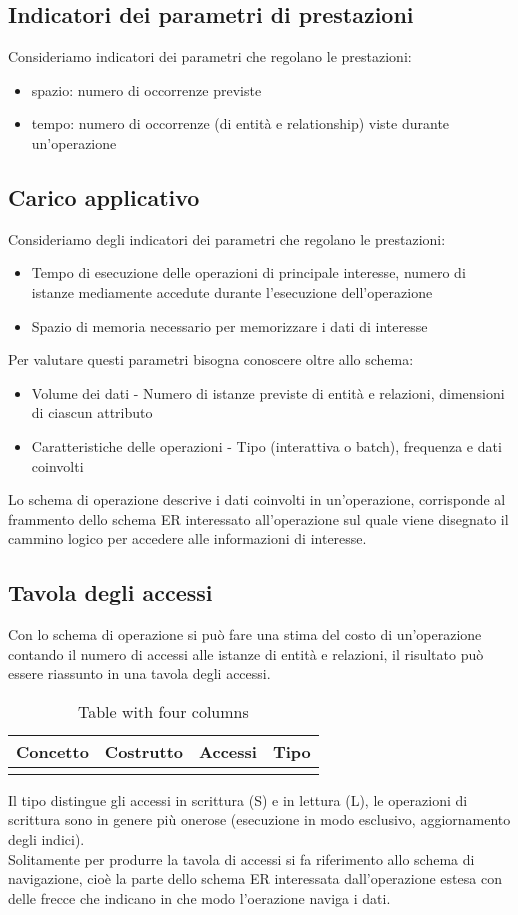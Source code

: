 \subsection*{Indicatori dei parametri di prestazioni}
Consideriamo indicatori dei parametri che regolano le prestazioni:
\begin{itemize}
    \item spazio: numero di occorrenze previste
    \item tempo: numero di occorrenze (di entità e relationship) viste durante un'operazione
\end{itemize}
\subsection{Carico applicativo}
Consideriamo degli indicatori dei parametri che regolano le prestazioni:
\begin{itemize}
    \item Tempo di esecuzione delle operazioni di principale interesse, numero di istanze mediamente
    accedute durante l'esecuzione dell'operazione
    \item Spazio di memoria necessario per memorizzare i dati di interesse
\end{itemize}
Per valutare questi parametri bisogna conoscere oltre allo schema:
\begin{itemize}
    \item Volume dei dati - Numero di istanze previste di entità e relazioni, dimensioni 
    di ciascun attributo
    \item Caratteristiche delle operazioni - Tipo (interattiva o batch), frequenza e dati coinvolti
\end{itemize}
Lo schema di operazione descrive i dati coinvolti in un'operazione, corrisponde al frammento dello
schema ER interessato all'operazione sul quale viene disegnato il cammino logico per accedere alle
informazioni di interesse.
\subsection{Tavola degli accessi}
Con lo schema di operazione si può fare una stima del costo di un'operazione contando
il numero di accessi alle istanze di entità e relazioni, il risultato può
essere riassunto in una tavola degli accessi.
\begin{table}[h]
    \centering
    \begin{tabular}{|c|c|c|c|}
      \hline
      Concetto & Costrutto & Accessi & Tipo \\
      \hline
      & & & \\
      \hline
    \end{tabular}
    \caption{Table with four columns}
    \label{tab:four-columns}
  \end{table}
  Il tipo distingue gli accessi in scrittura (S) e in lettura (L), le operazioni
  di scrittura sono in genere più onerose (esecuzione in modo esclusivo, aggiornamento degli
  indici).\\
  Solitamente per produrre la tavola di accessi si fa riferimento allo schema di navigazione, cioè
  la parte dello schema ER interessata dall'operazione estesa con delle frecce che indicano in che modo 
  l'oerazione naviga i dati.
